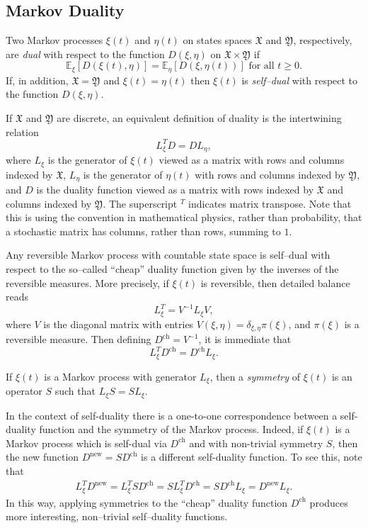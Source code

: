 \documentclass{ximera}
\begin{document}
\subsection{Markov Duality} \label{markovduality}



\begin{definition}
Two Markov processes $\xi(t)$ and $\eta(t)$ on states spaces $\mathfrak{X}$ and $\mathfrak{Y}$, respectively, are \textit{dual} with respect to the function $D(\xi,\eta)$ on $\mathfrak{X} \times \mathfrak{Y}$ if
$$
\mathbb{E}_\xi[D(\xi(t),\eta)] = \mathbb{E}_\eta[D(\xi,\eta(t))] \text{ for all } t\geq 0.
$$
If, in addition, $\mathfrak{X}=\mathfrak{Y}$ and $\xi(t)=\eta(t)$ then $\xi(t)$ is \textit{self--dual} with respect to the function $D(\xi,\eta)$.
\end{definition}

If $\mathfrak{X}$ and $\mathfrak{Y}$ are discrete, an equivalent definition of duality is the intertwining relation
$$
L_\xi^T D = DL_\eta,
$$
where $L_\xi$ is the generator of $\xi(t)$ viewed as a matrix with rows and columns indexed by $\mathfrak{X}$, $L_\eta$ is the generator of $\eta(t)$ with rows and columns indexed by $\mathfrak{Y}$, and $D$ is the duality function viewed as a matrix with rows indexed by $\mathfrak{X}$ and columns indexed by $\mathfrak{Y}$. The superscript $ ^T$ indicates matrix transpose. Note that this is using the convention in mathematical physics, rather than probability, that a stochastic matrix has columns, rather than rows, summing to $1$.

Any reversible Markov process with countable state space  is self--dual with respect to the so--called ``cheap'' duality function given by the inverses of the reversible measures. More precisely, if $\xi(t)$ is reversible, then detailed balance reads
$$
L_\xi^T = V^{-1}L_\xi V,
$$
where $V$ is the diagonal matrix with entries $V(\xi,\eta) = \delta_{\xi,\eta} \pi(\xi)$, and $\pi(\xi)$ is a reversible measure. Then defining $D^{\text{ch}}=V^{-1}$, it is immediate that
$$
L_\xi^TD^{\text{ch}} = D^{\text{ch}}L_\xi.
$$



\begin{definition} \label{symm}
If $\xi(t)$ is a Markov process with generator $L_\xi$, then a \textit{symmetry} of $\xi(t)$ is an operator $S$ such that $L_\xi S=SL_\xi$.
\end{definition}
In the context of self-duality there is a one-to-one correspondence between a self-duality function and the symmetry of the Markov process.  Indeed, if $\xi(t)$ is a Markov process which is self-dual via $D^{\text{ch}}$ and with non-trivial  symmetry $S$, then the new function $D^{\text{new}} = SD^{\text{ch}}$ is a different self-duality function. To see this, note that 
\begin{align*}
L_\xi^TD^{\text{new}} = L_\xi^T SD^{\text{ch}} = SL_\xi^T D^{\text{ch}} = SD^{\text{ch}}L_\xi =D^{\text{new}}L_\xi.
\end{align*}
In this way, applying symmetries to the ``cheap'' duality function $D^{\text{ch}}$ produces more interesting, non--trivial self--duality functions. 
\end{document}
